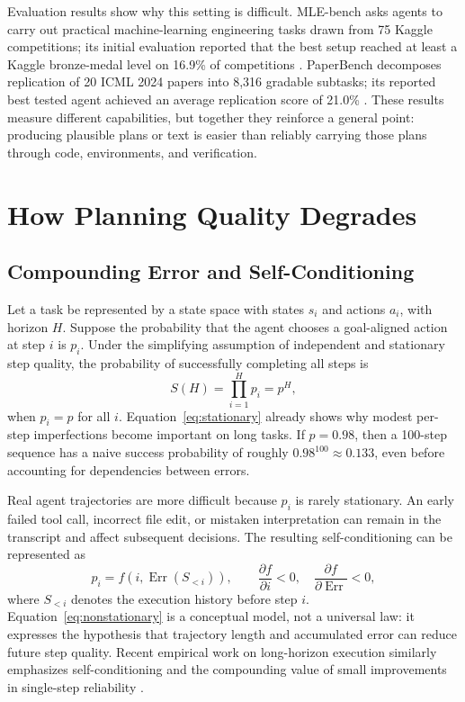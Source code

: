\documentclass[manuscript,screen]{acmart}
\begin{document}
Evaluation results show why this setting is difficult. MLE-bench asks agents to carry out practical machine-learning engineering tasks drawn from 75 Kaggle competitions; its initial evaluation reported that the best setup reached at least a Kaggle bronze-medal level on 16.9\% of competitions \cite{chan2024mlebench}. PaperBench decomposes replication of 20 ICML 2024 papers into 8,316 gradable subtasks; its reported best tested agent achieved an average replication score of 21.0\% \cite{starace2025paperbench}. These results measure different capabilities, but together they reinforce a general point: producing plausible plans or text is easier than reliably carrying those plans through code, environments, and verification.

\section{How Planning Quality Degrades}\label{sec:degradation}

\subsection{Compounding Error and Self-Conditioning}\label{sec:compounding}
Let a task be represented by a state space with states $s_i$ and actions $a_i$, with horizon $H$. Suppose the probability that the agent chooses a goal-aligned action at step $i$ is $p_i$. Under the simplifying assumption of independent and stationary step quality, the probability of successfully completing all steps is
\begin{equation}
S(H)=\prod_{i=1}^{H}p_i=p^H,
\label{eq:stationary}
\end{equation}
when $p_i=p$ for all $i$. Equation~\ref{eq:stationary} already shows why modest per-step imperfections become important on long tasks. If $p=0.98$, then a 100-step sequence has a naive success probability of roughly $0.98^{100}\approx0.133$, even before accounting for dependencies between errors.

Real agent trajectories are more difficult because $p_i$ is rarely stationary. An early failed tool call, incorrect file edit, or mistaken interpretation can remain in the transcript and affect subsequent decisions. The resulting self-conditioning can be represented as
\begin{equation}
p_i=f\!\left(i,\operatorname{Err}(S_{<i})\right),
\qquad
\frac{\partial f}{\partial i}<0,\quad
\frac{\partial f}{\partial \operatorname{Err}}<0,
\label{eq:nonstationary}
\end{equation}
where $S_{<i}$ denotes the execution history before step $i$. Equation~\ref{eq:nonstationary} is a conceptual model, not a universal law: it expresses the hypothesis that trajectory length and accumulated error can reduce future step quality. Recent empirical work on long-horizon execution similarly emphasizes self-conditioning and the compounding value of small improvements in single-step reliability \cite{sinha2025illusion}.
\end{document}
